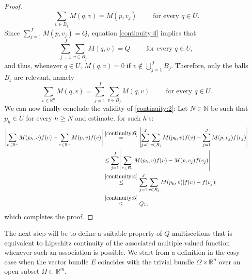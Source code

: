 \documentclass[a4paper,11pt,reqno]{amsart}
\theoremstyle{definition}
\numberwithin{equation}{section}
\numberwithin{subsection}{section}
\newcommand{\N}{\mathbb{N}}
\newcommand{\R}{\mathbb{R}}
\begin{document}
\begin{proof}
\begin{equation} \label{continuity:4}
\sum_{v \in B_{j}} M(q,v) = M(p,v_{j}) \hspace{1cm} \mbox{for every } q \in U.
\end{equation}
Since $\sum_{j=1}^{J} M(p,v_{j}) = Q$, equation \eqref{continuity:4} implies that
\begin{equation} \label{continuity:5}
\sum_{j=1}^{J} \sum_{v \in B_{j}} M(q,v) = Q \hspace{1cm} \mbox{for every } q \in U,
\end{equation}
and thus, whenever $q \in U$, $M(q,v) = 0$ if $v \notin \bigcup_{j=1}^{J} B_{j}$. Therefore, only the balls $B_{j}$ are relevant, namely
\begin{equation} \label{continuity:6}
\sum_{v \in \R^{n}} M(q,v) = \sum_{j=1}^{J} \sum_{v \in B_{j}} M(q,v) \hspace{1cm} \mbox{for every } q \in U.
\end{equation}
We can now finally conclude the validity of \eqref{continuity:2}: Let $N \in \N$ be such that $p_{h} \in U$ for every $h \geq N$ and estimate, for such $h$'s:
\[
\begin{split}
\left| \sum_{v \in \R^{n}} M(p_{h},v) f(v) - \sum_{v \in \R^{n}} M(p,v) f(v) \right| &\overset{\eqref{continuity:6}}{=} \left| \sum_{j=1}^{J} \sum_{v \in B_{j}} M(p_{h},v) f(v) - \sum_{j=1}^{J} M(p,v_{j}) f(v_{j}) \right| \\
&\leq \sum_{j=1}^{J} \left| \sum_{v \in B_{j}} M(p_h, v) f(v) - M(p,v_j) f(v_j) \right| \\
&\overset{\eqref{continuity:4}}{\leq} \sum_{j=1}^{J} \sum_{v \in B_{j}} M(p_{h},v) |f(v) - f(v_{j})| \\
&\overset{\eqref{continuity:5}}{\leq} Q \varepsilon,
\end{split}
\]
which completes the proof.
\end{proof}

The next step will be to define a suitable property of $Q$-multisections that is equivalent to Lipschitz continuity of the associated multiple valued function whenever such an association is possible. We start from a definition in the easy case when the vector bundle $E$ coincides with the trivial bundle $\Omega \times \R^{n}$ over an open subset $\Omega \subset \R^{m}$. 
\end{document}
